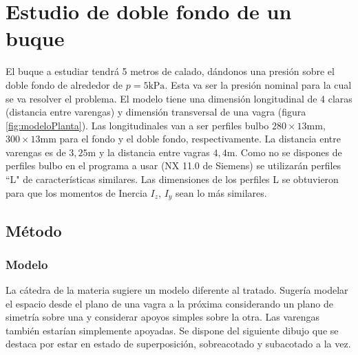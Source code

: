 \documentclass[onecolumn,10pt,titlepage]{article}
\begin{document}
\clearpage
\section{Estudio de doble fondo de un buque}
El buque a estudiar tendrá 5 metros de calado, dándonos una presión sobre el doble fondo de alrededor de $p=5 \si{\kilo \pascal}$. Esta va ser la presión nominal para la cual se va resolver el problema.  El modelo tiene una dimensión longitudinal de 4 claras (distancia entre varengas) y dimensión transversal de una vagra (figura \ref{fig:modeloPlanta}). Las longitudinales van a ser perfiles bulbo $280\times13\si{\milli \meter}$, $300\times 13 \si{\milli \meter}$ para el fondo y el doble fondo, respectivamente. La distancia entre varengas es de $3,25\si{\meter}$ y la distancia entre vagras $4,4\si{\meter}$. Como no se dispones de perfiles bulbo en el programa a usar (NX 11.0 de Siemens) se utilizarán perfiles ``L"{} de características similares. Las dimensiones de los perfiles L se obtuvieron para que los momentos de Inercia $I_z$, $I_y$ sean lo más similares. 


\subsection{Método}
\subsubsection*{Modelo}
La cátedra de la materia sugiere un modelo diferente al tratado. Sugería modelar el espacio desde el plano de una vagra a la próxima considerando un plano de simetría sobre una y considerar apoyos simples sobre la otra. Las varengas también estarían simplemente apoyadas. Se dispone del siguiente dibujo que se destaca por estar en estado de superposición, sobreacotado y subacotado a la vez.
\end{document}
